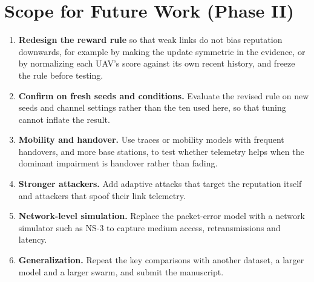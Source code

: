 \section{Scope for Future Work (Phase II)}
\begin{enumerate}
\item \textbf{Redesign the reward rule} so that weak links do not bias reputation
  downwards, for example by making the update symmetric in the evidence, or by
  normalizing each UAV's score against its own recent history, and freeze the rule
  before testing.
\item \textbf{Confirm on fresh seeds and conditions.} Evaluate the revised rule on
  new seeds and channel settings rather than the ten used here, so that tuning
  cannot inflate the result.
\item \textbf{Mobility and handover.} Use traces or mobility models with frequent
  handovers, and more base stations, to test whether telemetry helps when the
  dominant impairment is handover rather than fading.
\item \textbf{Stronger attackers.} Add adaptive attacks that target the reputation
  itself and attackers that spoof their link telemetry.
\item \textbf{Network-level simulation.} Replace the packet-error model with a
  network simulator such as NS-3 to capture medium access, retransmissions and
  latency.
\item \textbf{Generalization.} Repeat the key comparisons with another dataset, a
  larger model and a larger swarm, and submit the manuscript.
\end{enumerate}
